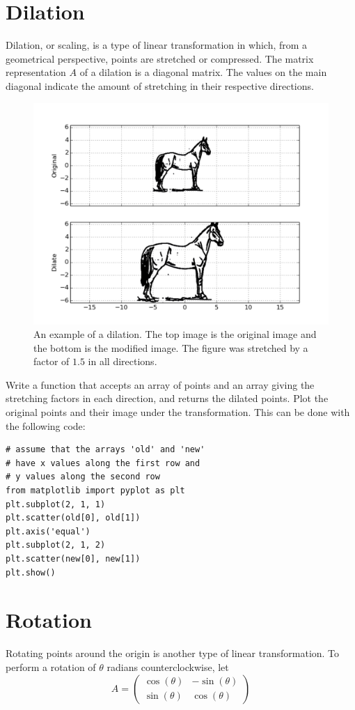 \section*{Dilation}
Dilation, or scaling, is a type of linear transformation in which, from a
geometrical perspective, points are stretched or compressed.
The matrix representation $A$ of a dilation is a diagonal matrix. The values
on the main diagonal indicate the amount of stretching in their respective
directions.
\begin{figure}
\centering
\includegraphics[width=\textwidth]{stretch.pdf}
\caption{
An example of a dilation. The top image is the original image and the bottom is
the modified image.
The figure was stretched by a factor of $1.5$ in all directions.}
\end{figure}

\begin{problem}
Write a function that accepts an array of points and an array giving the
stretching factors in each direction, and returns the dilated points.
Plot the original points and their image under the transformation.
This can be done with the following code:
\begin{lstlisting}
# assume that the arrays 'old' and 'new'
# have x values along the first row and
# y values along the second row
from matplotlib import pyplot as plt
plt.subplot(2, 1, 1)
plt.scatter(old[0], old[1])
plt.axis('equal')
plt.subplot(2, 1, 2)
plt.scatter(new[0], new[1])
plt.show()
\end{lstlisting}
\end{problem}

\section*{Rotation}
Rotating points around the origin is another type of linear transformation.
To perform a rotation of $\theta$ radians counterclockwise, let
\[
A = \begin{pmatrix}
\cos(\theta) & -\sin(\theta) \\
\sin(\theta) & \cos(\theta)
\end{pmatrix}
\]


